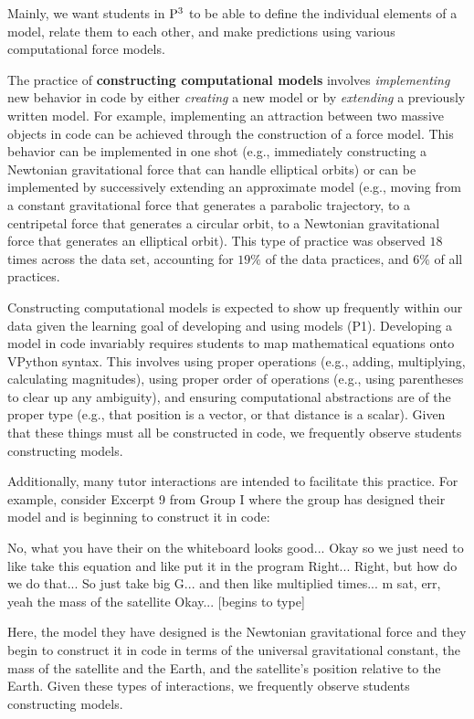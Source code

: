 \documentclass{msuphddissertation}
\begin{document}
\begin{doublespace}
Mainly, we want students in ${\rm P}^{3}$ to be able to define the individual elements of a model, relate them to each other, and make predictions using various computational force models.

%
%
%

The practice of \textbf{constructing computational models} involves \textit{implementing} new behavior in code by either \textit{creating} a new model or by \textit{extending} a previously written model.  For example, implementing an attraction between two massive objects in code can be achieved through the construction of a force model.  This behavior can be implemented in one shot (e.g., immediately constructing a Newtonian gravitational force that can handle elliptical orbits) or can be implemented by successively extending an approximate model (e.g., moving from a constant gravitational force that generates a parabolic trajectory, to a centripetal force that generates a circular orbit, to a Newtonian gravitational force that generates an elliptical orbit).  This type of practice was observed $18$ times across the data set, accounting for $19\%$ of the data practices, and $6\%$ of all practices.

Constructing computational models is expected to show up frequently within our data given the learning goal of developing and using models (P1).  Developing a model in code invariably requires students to map mathematical equations onto VPython syntax.  This involves using proper operations (e.g., adding, multiplying, calculating magnitudes), using proper order of operations (e.g., using parentheses to clear up any ambiguity), and ensuring computational abstractions are of the proper type (e.g., that position is a vector, or that distance is a scalar).  Given that these things must all be constructed in code, we frequently observe students constructing models.

Additionally, many tutor interactions are intended to facilitate this practice.  For example, consider Excerpt 9 from Group I where the group has designed their model and is beginning to construct it in code: \begin{description}
\TA No, what you have their {on the whiteboard} looks good...
\SD Okay so we just need to like take this equation and like
\SD put it in the program
\TA Right...
\SD Right, but how do we do that...
\SC So just take big G... and then like multiplied times...
\SC m sat, err, yeah the mass of the satellite
\SA Okay... [begins to type]
\end{description}  Here, the model they have designed is the Newtonian gravitational force and they begin to construct it in code in terms of the universal gravitational constant, the mass of the satellite and the Earth, and the satellite's position relative to the Earth.  Given these types of interactions, we frequently observe students constructing models.


\end{doublespace}
\end{document}

